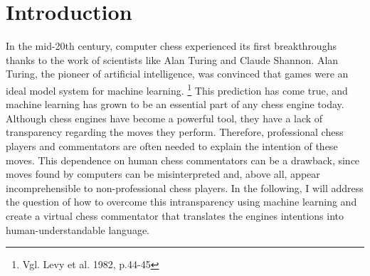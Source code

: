 \section{Introduction}

In the mid-20th century, computer chess experienced its first breakthroughs thanks to the work of scientists like Alan Turing and Claude Shannon. Alan Turing, the pioneer of artificial intelligence, was convinced that games were an ideal model system for machine learning. \footnote{Vgl. Levy et al. 1982, p.44-45} This prediction has come true, and machine learning has grown to be an essential part of any chess engine today. Although chess engines have become a powerful tool, they have a lack of transparency regarding the moves they perform. Therefore, professional chess players and commentators are often needed to explain the intention of these moves. This dependence on human chess commentators can be a drawback, since moves found by computers can be misinterpreted and, above all, appear incomprehensible to non-professional chess players. In the following, I will address the question of how to overcome this intransparency using machine learning and create a virtual chess commentator that translates the engines intentions into human-understandable language.